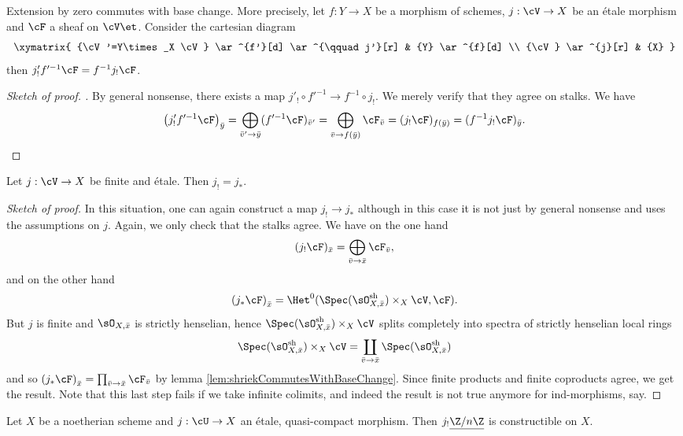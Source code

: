 \begin{lem} \label{lem:shriekCommutesWithBaseChange}
Extension by zero commutes with base change. More precisely, let $f: Y \to X$ be a morphism of schemes, $j: \cV \to X$ be an \'etale morphism and $\cF$ a sheaf on $\cV\et$. Consider the cartesian diagram 
$$
\xymatrix{
{\cV'=Y\times_X \cV} \ar^{f'}[d] \ar^{\qquad j'}[r] & {Y} \ar^{f}[d] \\
{\cV} \ar^{j}[r] & {X}
}
$$
then $j'_! f'^{-1}\cF = f^{-1}j_!\cF$.
\end{lem}

\begin{proof}[Sketch of proof. ]
By general nonsense, there exists a map $j'_! \circ f'^{-1} \to f^{-1}\circ j_!$. We merely verify that they agree on stalks. We have
$$
\left(j_!'f'^{-1}\cF\right)_{\bar y}  = 
\bigoplus_{\bar v' \to \bar y} (f'^{-1}\cF)_{\bar v'} =
\bigoplus_{\bar v \to f(\bar y)} \cF_{\bar v} = 
(j_!\cF)_{f(\bar y)} =  
(f^{-1}j_!\cF)_{\bar y}.
$$
\end{proof}

\begin{lem} \label{lem:ShriekEqualsStarForFiniteEtale}
Let $j: \cV\to X$ be finite and \'etale. Then $j_! = j_*$.
\end{lem}

\begin{proof}[Sketch of proof] 
In this situation, one can again construct a map $j_! \to j_*$ although in this case it is not just by general nonsense and uses the assumptions on $j$. Again, we only check that the stalks agree. We have on the one hand
$$
(j_!\cF)_{\bar x} = 
\bigoplus_{\bar v \to \bar x} \cF_{\bar v},
$$
and on the other hand
$$
\left(j_* \cF \right)_{\bar x} = \Het^0(\Spec(\sO_{X, \bar x}^\text{sh})\times_X \cV, \cF).
$$
But $j$ is finite and $\sO_{X, \bar x}$ is strictly henselian, hence $\Spec(\sO_{X, \bar x}^\text{sh})\times_X \cV$ splits completely into spectra of strictly henselian  local rings
$$
\Spec(\sO_{X, \bar x}^\text{sh})\times_X \cV = \coprod_{\bar v \to \bar x} \Spec(\sO_{X, \bar x}^\text{sh})
$$
and so $\left(j_* \cF \right)_{\bar x} = \prod_{\bar v \to \bar x} \cF_{\bar v}$ by lemma \ref{lem:shriekCommutesWithBaseChange}. Since finite products and finite coproducts agree, we get the result. Note that this last step fails if we take infinite colimits, and indeed the result is not true anymore for ind-morphisms, say.
\end{proof}

\begin{lem} 
Let $X$ be a noetherian scheme and $j: \cU \to X$ an \'etale, quasi-compact morphism. Then $j_!\underline{\Z/n\Z}$ is constructible on $X$. 
\end{lem}

